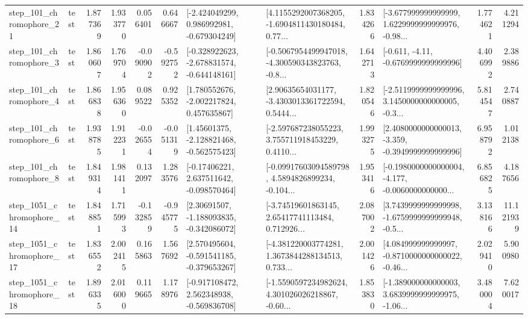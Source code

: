 \begin{tabular}{llrrrrllrlrr}
  step\_101\_chromophore\_21 &      test &      1.877369 &    1.933770 &      0.056401 &  0.646667 &   [-2.424049299, 0.986992981, -0.679304249] &  [4.1155292007368205, -1.6904811430180484, 0.77... &       1.834266 &  [-3.677999999999999, 1.6229999999999976, -0.98... &            1.774621 &          4.211294 \\
   step\_101\_chromophore\_3 &      test &      1.860607 &    1.769704 &     -0.090902 & -0.592752 &  [-0.328922623, -2.678831574, -0.644148161] &  [-0.5067954499947018, -4.300590343823763, -0.8... &       1.642713 &               [-0.611, -4.11, -0.6769999999999996] &            4.406992 &          2.389886 \\
   step\_101\_chromophore\_4 &      test &      1.866838 &    1.956360 &      0.089522 &  0.925352 &    [1.780552676, -2.002217824, 0.457635867] &  [2.90635654031177, -3.4303013361722594, 0.5444... &       1.820546 &  [-2.5119999999999996, 3.1450000000000005, -0.3... &            5.814547 &          2.740887 \\
   step\_101\_chromophore\_6 &      test &      1.938785 &    1.912231 &     -0.026554 & -0.051319 &    [1.45601375, -2.128821468, -0.562575423] &  [-2.597687238055223, 3.755711918453229, 0.4110... &       1.993275 &  [2.4080000000000013, -3.359, -0.3949999999999996] &            6.958792 &          1.012138 \\
   step\_101\_chromophore\_8 &      test &      1.849314 &    1.981411 &      0.132097 &  1.283576 &    [-0.17406221, 2.637511642, -0.098570464] &  [-0.09917603094589798, 4.5894826899234, -0.104... &       1.953416 &  [-0.1980000000000004, -4.177, -0.0060000000000... &            6.856825 &          4.187656 \\
 step\_1051\_chromophore\_14 &      test &      1.848851 &    1.715993 &     -0.132859 & -0.945775 &    [2.30691507, -1.188093835, -0.342086072] &  [-3.74519601863145, 2.65417741113484, 0.712926... &       2.087002 &  [3.7439999999999998, -1.6759999999999948, -0.5... &            3.138166 &         11.121939 \\
 step\_1051\_chromophore\_17 &      test &      1.836552 &    2.002415 &      0.165863 &  1.567692 &   [2.570495604, -0.591541185, -0.379653267] &  [-4.381220003774281, 1.3673844288134513, 0.733... &       2.001426 &  [4.084999999999997, -0.8710000000000022, -0.46... &            2.029410 &          5.900980 \\
 step\_1051\_chromophore\_18 &      test &      1.896335 &    2.016000 &      0.119665 &  1.178976 &   [-0.917108472, 2.562348938, -0.569836708] &  [-1.5590597234982624, 4.301026026218867, -0.60... &       1.853830 &  [-1.389000000000003, 3.6839999999999975, -1.06... &            3.480004 &          7.620017 \\

\end{tabular}

